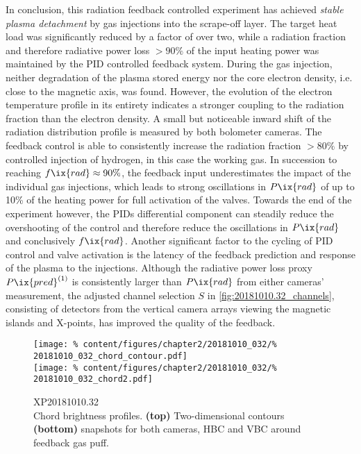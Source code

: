 %
            In conclusion, this radiation feedback controlled experiment has achieved \textit{stable plasma detachment} by gas injections into the scrape-off layer. The target heat load was significantly reduced by a factor of over two, while a radiation fraction and therefore radiative power loss $>90\%$ of the input heating power was maintained by the PID controlled feedback system. During the gas injection, neither degradation of the plasma stored energy nor the core electron density, i.e. close to the magnetic axis, was found. However, the evolution of the electron temperature profile in its entirety indicates a stronger coupling to the radiation fraction than the electron density. A small but noticeable inward shift of the radiation distribution profile is measured by both bolometer cameras. The feedback control is able to consistently increase the radiation fraction $>80\%$ by controlled injection of hydrogen, in this case the working gas. In succession to reaching $f\ix{rad}\approx90\%$, the feedback input underestimates the impact of the individual gas injections, which leads to strong oscillations in $P\ix{rad}$ of up to 10\% of the heating power for full activation of the valves. Towards the end of the experiment however, the PIDs differential component can steadily reduce the overshooting of the control and therefore reduce the oscillations in $P\ix{rad}$ and conclusively $f\ix{rad}$. Another significant factor to the cycling of PID control and valve activation is the latency of the feedback prediction and response of the plasma to the injections. Although the radiative power loss proxy $P\ix{pred}^{\left(1\right)}$ is consistently larger than $P\ix{rad}$ from either cameras' measurement, the adjusted channel selection $S$ in \cref{fig:20181010.32_channels}, consisting of detectors from the vertical camera arrays viewing the magnetic islands and X-points, has improved the quality of the feedback.\\%
%
            \begin{figure}[t]%
                \centering%
                \texttt{[image: \%
                    content/figures/chapter2/20181010\_032/\%
                    20181010\_032\_chord\_contour.pdf]}\\%
                \texttt{[image: \%
                    content/figures/chapter2/20181010\_032/\%
                    20181010\_032\_chord2.pdf]}\\%
                \caption{%
                    XP20181010.32\\%
                    Chord brightness profiles. \textbf{(top)} Two-dimensional contours \textbf{(bottom)} snapshots for both cameras, HBC and VBC around feedback gas puff.}\label{fig:20181010.32_CP}%
            \end{figure}%
